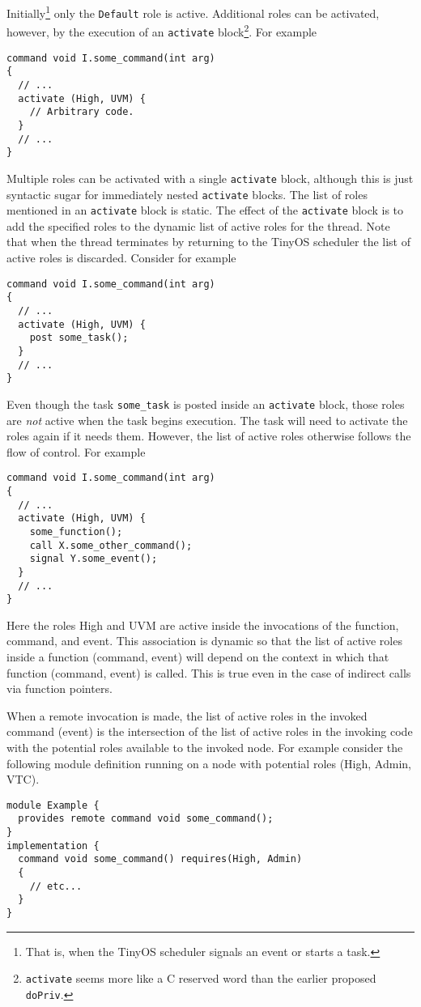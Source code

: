 Initially\footnote{That is, when the TinyOS scheduler signals an event or starts a task.} only
the \texttt{Default} role is active. Additional roles can be activated, however, by the
execution of an \texttt{activate} block\footnote{\texttt{activate} seems more like a C reserved
word than the earlier proposed \texttt{doPriv}.}. For example
\begin{verbatim}
command void I.some_command(int arg)
{
  // ...
  activate (High, UVM) {
    // Arbitrary code.
  }
  // ...
}
\end{verbatim}

Multiple roles can be activated with a single \texttt{activate} block, although this is just
syntactic sugar for immediately nested \texttt{activate} blocks. The list of roles mentioned in
an \texttt{activate} block is static. The effect of the \texttt{activate} block is to add the
specified roles to the dynamic list of active roles for the thread. Note that when the thread
terminates by returning to the TinyOS scheduler the list of active roles is discarded. Consider
for example
\begin{verbatim}
command void I.some_command(int arg)
{
  // ...
  activate (High, UVM) {
    post some_task();
  }
  // ...
}
\end{verbatim}

Even though the task \texttt{some\_task} is posted inside an \texttt{activate} block, those
roles are \emph{not} active when the task begins execution. The task will need to activate the
roles again if it needs them. However, the list of active roles otherwise follows the flow
of control. For example
\begin{verbatim}
command void I.some_command(int arg)
{
  // ...
  activate (High, UVM) {
    some_function();
    call X.some_other_command();
    signal Y.some_event();
  }
  // ...
}
\end{verbatim}

Here the roles High and UVM are active inside the invocations of the function, command, and
event. This association is dynamic so that the list of active roles inside a function (command,
event) will depend on the context in which that function (command, event) is called. This is
true even in the case of indirect calls via function pointers.

When a remote invocation is made, the list of active roles in the invoked command (event) is the
intersection of the list of active roles in the invoking code with the potential roles available
to the invoked node. For example consider the following module definition running on a node
with potential roles (High, Admin, VTC).
\begin{verbatim}
module Example {
  provides remote command void some_command();
}
implementation {
  command void some_command() requires(High, Admin)
  {
    // etc...
  }
}
\end{verbatim}

